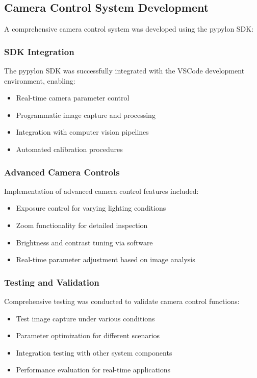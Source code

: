 \documentclass{book}
\begin{document}
\subsection{Camera Control System Development}
\par\noindent A comprehensive camera control system was developed using the pypylon SDK:

\subsubsection{SDK Integration}
\par\noindent The pypylon SDK was successfully integrated with the VSCode development environment, enabling:

\begin{itemize}
\item Real-time camera parameter control
\item Programmatic image capture and processing
\item Integration with computer vision pipelines
\item Automated calibration procedures
\end{itemize}

\subsubsection{Advanced Camera Controls}
\par\noindent Implementation of advanced camera control features included:

\begin{itemize}
\item Exposure control for varying lighting conditions
\item Zoom functionality for detailed inspection
\item Brightness and contrast tuning via software
\item Real-time parameter adjustment based on image analysis
\end{itemize}

\subsubsection{Testing and Validation}
\par\noindent Comprehensive testing was conducted to validate camera control functions:

\begin{itemize}
\item Test image capture under various conditions
\item Parameter optimization for different scenarios
\item Integration testing with other system components
\item Performance evaluation for real-time applications
\end{itemize}
\end{document}
